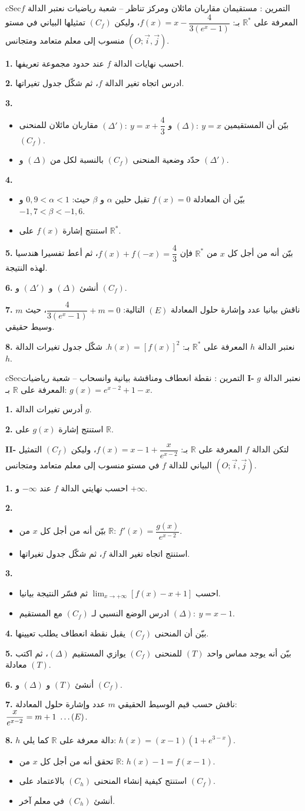 \documentclass[12pt,a4paper]{article}
\newenvironment{BOX}[2]{\begin{otherlanguage}{english}\begin{arbox}{#1}{#2}}{\end{arbox}\end{otherlanguage}}
\newcounter{exo}
\newenvironment{tamrin}[1]{\stepcounter{exo}\begin{BOX}{cSec}{التمرين \theexo: #1}}{\end{BOX}}
\renewcommand{\ldots}{\mathinner{\ldotp\ldotp\ldotp}}
\newcommand{\R}{\mathbb{R}}
\newenvironment{sq}{\begin{itemize}[leftmargin=2.4em,itemsep=3pt]}{\end{itemize}}
\newcommand{\qa}{\item[(أ)]}\newcommand{\qb}{\item[(ب)]}\newcommand{\qc}{\item[(جـ)]}\newcommand{\qd}{\item[(د)]}\newcommand{\qe}{\item[(هـ)]}
\newcommand{\QQ}[1]{\par\smallskip\textbf{#1.} }
\begin{document}
\begin{tamrin}{مستقيمان مقاربان مائلان ومركز تناظر -- شعبة رياضيات}
نعتبر الدالة $f$ المعرفة على $\R^{*}$ بـ: $f(x)=x-\dfrac{4}{3\left(e^{x}-1\right)}$، وليكن $(C_f)$ تمثيلها البياني في مستو منسوب إلى معلم متعامد ومتجانس $\left(O;\vec i,\vec j\right)$.
\QQ{1} احسب نهايات الدالة $f$ عند حدود مجموعة تعريفها.
\QQ{2} ادرس اتجاه تغير الدالة $f$، ثم شكّل جدول تغيراتها.
\QQ{3} \begin{sq}
\qa بيّن أن المستقيمين $(\Delta):\ y=x$ و $(\Delta'):\ y=x+\dfrac43$ مقاربان مائلان للمنحنى $(C_f)$.
\qb حدّد وضعية المنحنى $(C_f)$ بالنسبة لكل من $(\Delta)$ و $(\Delta')$.
\end{sq}
\QQ{4} \begin{sq}
\qa بيّن أن المعادلة $f(x)=0$ تقبل حلين $\alpha$ و $\beta$ حيث: $0{,}9<\alpha<1$ و $-1{,}7<\beta<-1{,}6$.
\qb استنتج إشارة $f(x)$ على $\R^{*}$.
\end{sq}
\QQ{5} بيّن أنه من أجل كل $x$ من $\R^{*}$ فإن $f(x)+f(-x)=\dfrac43$، ثم أعط تفسيرا هندسيا لهذه النتيجة.
\QQ{6} أنشئ $(\Delta)$ و $(\Delta')$ و $(C_f)$.
\QQ{7} ناقش بيانيا عدد وإشارة حلول المعادلة $(E)$ التالية: $\dfrac{4}{3\left(e^{x}-1\right)}+m=0$، حيث $m$ وسيط حقيقي.
\QQ{8} نعتبر الدالة $h$ المعرفة على $\R^{*}$ بـ: $h(x)=\left[f(x)\right]^{2}$. شكّل جدول تغيرات الدالة $h$.
\end{tamrin}
\begin{tamrin}{نقطة انعطاف ومناقشة بيانية وانسحاب -- شعبة رياضيات}
\textbf{I-} نعتبر الدالة $g$ المعرفة على $\R$ بـ: $g(x)=e^{x-2}+1-x$.
\QQ{1} أدرس تغيرات الدالة $g$.
\QQ{2} استنتج إشارة $g(x)$ على $\R$.

\textbf{II-} لتكن الدالة $f$ المعرفة على $\R$ بـ: $f(x)=x-1+\dfrac{x}{e^{x-2}}$، وليكن $(C_f)$ التمثيل البياني للدالة $f$ في مستو منسوب إلى معلم متعامد ومتجانس $\left(O;\vec i,\vec j\right)$.
\QQ{1} احسب نهايتي الدالة $f$ عند $-\infty$ و $+\infty$.
\QQ{2} \begin{sq}
\qa بيّن أنه من أجل كل $x$ من $\R$: $f'(x)=\dfrac{g(x)}{e^{x-2}}$.
\qb استنتج اتجاه تغير الدالة $f$، ثم شكّل جدول تغيراتها.
\end{sq}
\QQ{3} \begin{sq}
\qa احسب $\displaystyle\lim_{x\to+\infty}\left[f(x)-x+1\right]$ ثم فسّر النتيجة بيانيا.
\qb ادرس الوضع النسبي لـ $(C_f)$ مع المستقيم $(\Delta):\ y=x-1$.
\end{sq}
\QQ{4} بيّن أن المنحنى $(C_f)$ يقبل نقطة انعطاف يطلب تعيينها.
\QQ{5} بيّن أنه يوجد مماس واحد $(T)$ للمنحنى $(C_f)$ يوازي المستقيم $(\Delta)$، ثم اكتب معادلة $(T)$.
\QQ{6} أنشئ $(T)$ و $(\Delta)$ و $(C_f)$.
\QQ{7} ناقش حسب قيم الوسيط الحقيقي $m$ عدد وإشارة حلول المعادلة: $\dfrac{x}{e^{x-2}}=m+1\ \ldots(E)$.
\QQ{8} $h$ دالة معرفة على $\R$ كما يلي: $h(x)=(x-1)\left(1+e^{3-x}\right)$.
\begin{sq}
\qa تحقق أنه من أجل كل $x$ من $\R$: $h(x)-1=f(x-1)$.
\qb استنتج كيفية إنشاء المنحنى $(C_h)$ بالاعتماد على $(C_f)$.
\qc أنشئ $(C_h)$ في معلم آخر.
\end{sq}
\end{tamrin}
\end{document}
